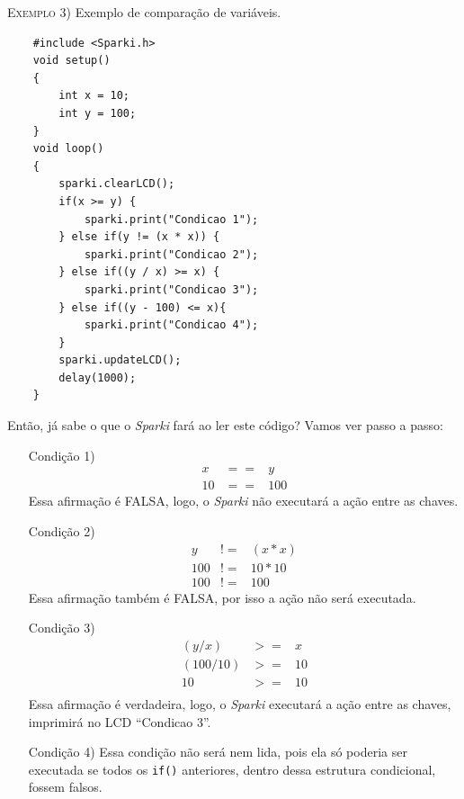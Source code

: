     \textsc{Exemplo 3)} Exemplo de comparação de variáveis.
    
    \begin{verbatim}
    #include <Sparki.h>
    void setup()
    {
        int x = 10;
        int y = 100;
    }
    void loop()
    {
        sparki.clearLCD();
        if(x >= y) {
            sparki.print("Condicao 1");
        } else if(y != (x * x)) {
            sparki.print("Condicao 2");
        } else if((y / x) >= x) {
            sparki.print("Condicao 3");
        } else if((y - 100) <= x){
            sparki.print("Condicao 4");
        }
        sparki.updateLCD();
        delay(1000);
    }
    \end{verbatim}
    
    Então, já sabe o que o \textsl{Sparki} fará ao ler este código? Vamos ver passo a passo:
    
    \begin{itemize}
        \item[Condição 1)]
        \begin{eqnarray}
        x & == & y\\
        10 & == & 100 \nonumber     \end{eqnarray}
        Essa afirmação é FALSA, logo, o \textsl{Sparki} não executará a ação entre as chaves.
        \item[Condição 2)]
        \begin{eqnarray}
        y & != & (x * x)\\
        100 & != & 10 * 10 \nonumber\\
        100 & != & 100 \nonumber
        \end{eqnarray}
        Essa afirmação também é FALSA, por isso a ação não será executada.
        \item[Condição 3)]
        \begin{eqnarray}
        (y / x) & >= & x\\
        (100 / 10) & >= & 10 \nonumber\\
        10 & >= & 10 \nonumber\\
        \end{eqnarray}
        Essa afirmação é verdadeira, logo, o \textsl{Sparki} executará a ação entre as chaves, imprimirá no LCD ``Condicao 3''.
        \item[Condição 4)]
        Essa condição não será nem lida, pois ela só poderia ser executada se todos os \texttt{if()} anteriores, dentro dessa estrutura condicional, fossem falsos.
    \end{itemize}
    
